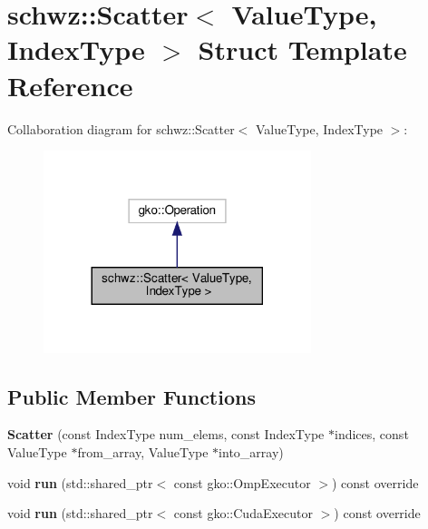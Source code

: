 \hypertarget{structschwz_1_1Scatter}{}\section{schwz\+:\+:Scatter$<$ Value\+Type, Index\+Type $>$ Struct Template Reference}
\label{structschwz_1_1Scatter}


Collaboration diagram for schwz\+:\+:Scatter$<$ Value\+Type, Index\+Type $>$\+:
\nopagebreak
\begin{figure}[H]
\begin{center}
\leavevmode
\includegraphics[width=221pt]{structschwz_1_1Scatter__coll__graph}
\end{center}
\end{figure}
\subsection*{Public Member Functions}
\begin{DoxyCompactItemize}
\item 
\mbox{\label{structschwz_1_1Scatter_ab23a9952e9764016b3d321504fee47e3}} 
{\bfseries Scatter} (const Index\+Type num\+\_\+elems, const Index\+Type $\ast$indices, const Value\+Type $\ast$from\+\_\+array, Value\+Type $\ast$into\+\_\+array)
\item 
\mbox{\label{structschwz_1_1Scatter_a4887ae16bc4abacf64366359ab9b6ef6}} 
void {\bfseries run} (std\+::shared\+\_\+ptr$<$ const gko\+::\+Omp\+Executor $>$) const override
\item 
\mbox{\label{structschwz_1_1Scatter_a12807bf0b409347b9a5e7c948b93be32}} 
void {\bfseries run} (std\+::shared\+\_\+ptr$<$ const gko\+::\+Cuda\+Executor $>$) const override
\end{DoxyCompactItemize}
